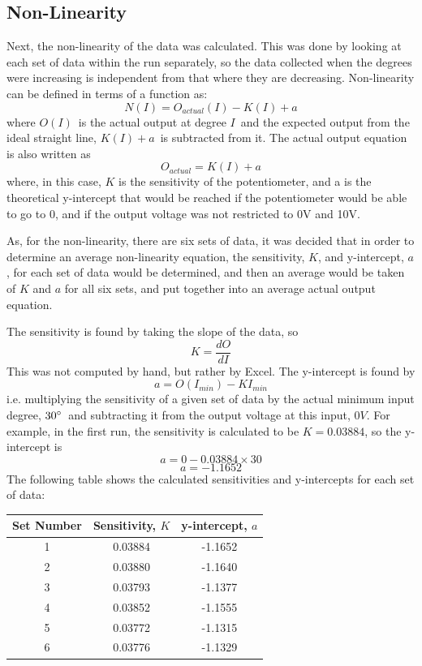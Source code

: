 \documentclass[a4,11pt]{article}
\begin{document}
\subsection{Non-Linearity}
Next, the non-linearity of the data was calculated. This was done by looking at each set of data within the run separately, so the data collected when the degrees were increasing is independent from that where they are decreasing.
Non-linearity can be defined in terms of a function as:
$$N(I)=O_{actual}(I)-K(I)+a$$
where $O(I)$\ is the actual output at degree $I$\ and the expected output from the ideal straight line, $K(I)+a$\ is subtracted from it. The actual output equation is also written as
$$O_{actual}=K(I)+a$$
where, in this case, $K$ is the sensitivity of the potentiometer, and a is the theoretical y-intercept that would be reached if the potentiometer would be able to go to 0\degree, and if the output voltage was not restricted to 0V and 10V.

As, for the non-linearity, there are six sets of data, it was decided that in order to determine an average non-linearity equation, the sensitivity, $K$, and y-intercept, $a$, for each set of data would be determined, and then an average would be taken of $K$ and $a$ for all six sets, and put together into an average actual output equation.

The sensitivity is found by taking the slope of the data, so
$$K=\frac{dO}{dI}$$
This was not computed by hand, but rather by Excel. The y-intercept is found by
$$a=O(I_{min})-KI_{min}$$
i.e. multiplying the sensitivity of a given set of data by the actual minimum input degree, $30\degree$\ and subtracting it from the output voltage at this input, $0V$. For example, in the first run, the sensitivity is calculated to be $K=0.03884$, so the y-intercept is
$$a=0-0.03884\times30$$
$$a=-1.1652$$
The following table shows the calculated sensitivities and y-intercepts for each set of data:
\begin{center}
	\begin{tabular}{c|c|c}
		Set Number & Sensitivity, $K$ & y-intercept, $a$ \\
		\hline
		1 & 0.03884 & -1.1652 \\
		2 & 0.03880 & -1.1640 \\
		3 & 0.03793 & -1.1377 \\
		4 & 0.03852 & -1.1555 \\
		5 & 0.03772 & -1.1315 \\
		6 & 0.03776 & -1.1329 \\
		\hline
	\end{tabular}
\end{center}
\end{document}
